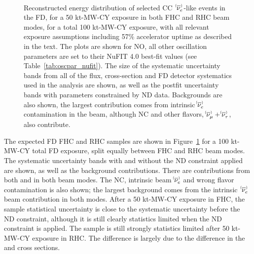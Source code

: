 \begin{figure}[htbp]
 \\
 \caption{Reconstructed energy distribution of selected CC $\;\nue^{\bracketbar}$-like events in the FD, for a 50 kt-MW-CY exposure in both FHC and RHC beam modes, for a total 100 kt-MW-CY exposure, with all relevant exposure assumptions including 57\% accelerator uptime as described in the text. The plots are shown for NO, all other oscillation parameters are set to their NuFIT 4.0 best-fit values (see Table~\ref{tab:oscpar_nufit}). The size of the systematic uncertainty bands from all of the flux, cross-section and FD detector systematics used in the analysis are shown, as well as the postfit uncertainty bands with parameters constrained by ND data. Backgrounds are also shown, the largest contribution comes from intrinsic $\nue^{\bracketbar}$ contamination in the beam, although NC and other flavors, $\numu^{\bracketbar} + \nutau^{\bracketbar}$, also contribute.}
 \label{fig:appspectra}
\end{figure}
The expected FD FHC \nue and RHC \anue samples are shown in Figure~\ref{fig:appspectra} for a 100 kt-MW-CY total FD exposure, split equally between FHC and RHC beam modes. The systematic uncertainty bands with and without the ND constraint applied are shown, as well as the background contributions. There are contributions from both \nue and \anue in both beam modes. The NC, intrinsic beam $\nue^{\bracketbar}$ and wrong flavor contamination is also shown; the largest background comes from the intrinsic $\;\nue^{\bracketbar}$ beam contribution in both modes. After a 50 kt-MW-CY exposure in FHC, the \nue sample statistical uncertainty is close to the systematic uncertainty before the ND constraint, although it is still clearly statistics limited when the ND constraint is applied. The \anue sample is still strongly statistics limited after 50 kt-MW-CY exposure in RHC. The difference is largely due to the difference in the \nue and \anue cross sections. %


